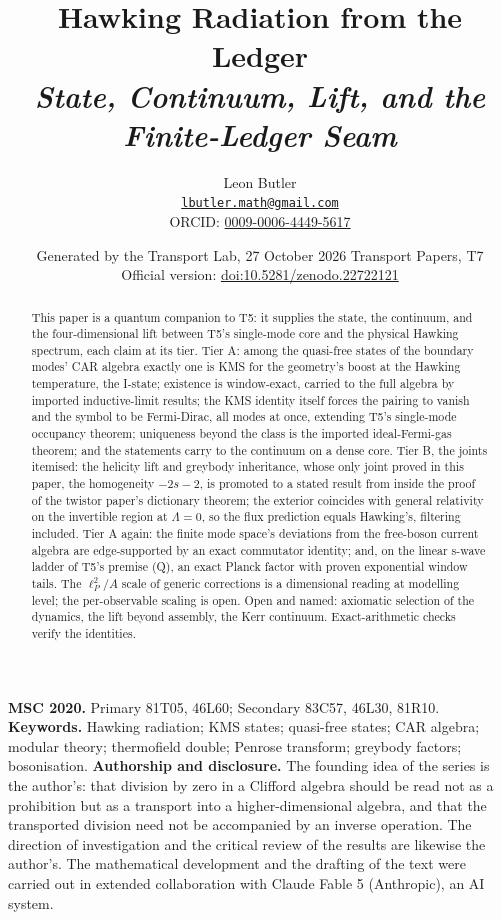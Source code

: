 \documentclass[11pt]{article}
\title{\bfseries Hawking Radiation from the Ledger\\[4pt]\large\itshape State, Continuum, Lift, and the Finite-Ledger Seam}
\author{Leon Butler\\ \normalsize\href{mailto:lbutler.math@gmail.com}{\texttt{lbutler.math@gmail.com}}\\ \normalsize ORCID: \href{https://orcid.org/0009-0006-4449-5617}{0009-0006-4449-5617}}
\date{Generated by the Transport Lab, 27 October 2026 \textperiodcentered{} Transport Papers, T7\\[3pt]\small Official version: \href{https://doi.org/10.5281/zenodo.22722121}{doi:10.5281/zenodo.22722121}}
\theoremstyle{definition}
\theoremstyle{plain}
\begin{document}
\maketitle
\begin{abstract}
\normalsize
This paper is a quantum companion to T5: it supplies the state, the continuum, and the four-dimensional lift between T5's single-mode core and the physical Hawking spectrum, each claim at its tier. Tier A: among the quasi-free states of the boundary modes' CAR algebra exactly one is KMS for the geometry's boost at the Hawking temperature, the I-state; existence is window-exact, carried to the full algebra by imported inductive-limit results; the KMS identity itself forces the pairing to vanish and the symbol to be Fermi-Dirac, all modes at once, extending T5's single-mode occupancy theorem; uniqueness beyond the class is the imported ideal-Fermi-gas theorem; and the statements carry to the continuum on a dense core. Tier B, the joints itemised: the helicity lift and greybody inheritance, whose only joint proved in this paper, the homogeneity $-2s-2$, is promoted to a stated result from inside the proof of the twistor paper's dictionary theorem; the exterior coincides with general relativity on the invertible region at $\Lambda = 0$, so the flux prediction equals Hawking's, filtering included. Tier A again: the finite mode space's deviations from the free-boson current algebra are edge-supported by an exact commutator identity; and, on the linear s-wave ladder of T5's premise (Q), an exact Planck factor with proven exponential window tails. The $\ell_P^2/A$ scale of generic corrections is a dimensional reading at modelling level; the per-observable scaling is open. Open and named: axiomatic selection of the dynamics, the lift beyond assembly, the Kerr continuum. Exact-arithmetic checks verify the identities.
\end{abstract}
\medskip
\noindent\textbf{MSC 2020.} Primary 81T05, 46L60; Secondary 83C57, 46L30, 81R10.\\
\textbf{Keywords.} Hawking radiation; KMS states; quasi-free states; CAR algebra; modular theory; thermofield double; Penrose transform; greybody factors; bosonisation.
\newpage
\noindent \textbf{Authorship and disclosure. }The founding idea of the series is the author's: that division by zero in a Clifford algebra should be read not as a prohibition but as a transport into a higher-dimensional algebra, and that the transported division need not be accompanied by an inverse operation. The direction of investigation and the critical review of the results are likewise the author's. The mathematical development and the drafting of the text were carried out in extended collaboration with Claude Fable 5 (Anthropic), an AI system.
\end{document}
